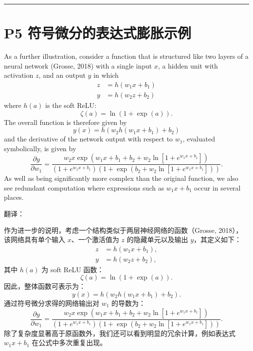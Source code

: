 \documentclass{article}
\begin{document}
\noindent\rule{\linewidth}{0.4pt}

\section{P5 符号微分的表达式膨胀示例}

As a further illustration, consider a function that is structured like two layers of a neural network (Grosse, 2018) with a single input $x$, a hidden unit with activation $z$, and an output $y$ in which
\begin{align}
z &= h(w_1 x + b_1) \tag{8.44} \\
y &= h(w_2 z + b_2) \tag{8.45}
\end{align}
where $h(a)$ is the soft ReLU:
\begin{equation}
\zeta(a) = \ln\left(1 + \exp(a)\right). 
\tag{8.46}
\end{equation}
The overall function is therefore given by
\begin{equation}
y(x) = h\left(w_2 h(w_1 x + b_1) + b_2\right) \tag{8.47}
\end{equation}
and the derivative of the network output with respect to $w_1$, evaluated symbolically, is given by
\begin{equation}
\frac{\partial y}{\partial w_1} = \frac{w_2 x \exp\left(w_1 x + b_1 + b_2 + w_2 \ln\left[1 + e^{w_1 x + b_1}\right]\right)}{\left(1 + e^{w_1 x + b_1}\right)\left(1 + \exp\left(b_2 + w_2 \ln\left[1 + e^{w_1 x + b_1}\right]\right)\right)}. 
\tag{8.48}
\end{equation}
As well as being significantly more complex than the original function, we also see redundant computation where expressions such as $w_1 x + b_1$ occur in several places.

{\color{red}
翻译：

作为进一步的说明，考虑一个结构类似于两层神经网络的函数（Grosse, 2018），该网络具有单个输入 $x$、一个激活值为 $z$ 的隐藏单元以及输出 $y$，其定义如下：
\begin{align}
    z &= h(w_1 x + b_1), \tag{8.44} \\
    y &= h(w_2 z + b_2), \tag{8.45}
\end{align}
其中 $h(a)$ 为 soft ReLU 函数：
\begin{equation}
    \zeta(a) = \ln\left(1 + \exp(a)\right). \tag{8.46}
\end{equation}
因此，整体函数可表示为：
\begin{equation}
    y(x) = h\left(w_2 h(w_1 x + b_1) + b_2\right). \tag{8.47}
\end{equation}
通过符号微分求得的网络输出对 $w_1$ 的导数为：
\begin{equation}
    \frac{\partial y}{\partial w_1} = \frac{w_2 x \exp\left(w_1 x + b_1 + b_2 + w_2 \ln\left[1 + e^{w_1 x + b_1}\right]\right)}{\left(1 + e^{w_1 x + b_1}\right)\left(1 + \exp\left(b_2 + w_2 \ln\left[1 + e^{w_1 x + b_1}\right]\right)\right)}. \tag{8.48}
\end{equation}
除了复杂度显著高于原函数外，我们还可以看到明显的冗余计算，例如表达式 $w_1 x + b_1$ 在公式中多次重复出现。
}
\end{document}

